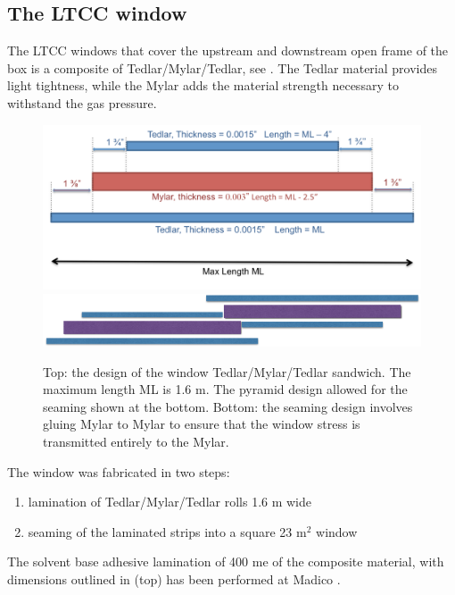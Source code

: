 \subsection{The LTCC window}

The LTCC windows that cover the upstream and downstream open frame of the box is a composite of Tedlar/Mylar/Tedlar, see . The Tedlar
material provides light tightness, while the Mylar adds the material strength necessary to withstand the gas pressure.

\begin{figure}
	\centering
	\includegraphics[width=1.0\columnwidth,keepaspectratio]{img/windowDesign.png}
	\includegraphics[width=1.0\columnwidth,keepaspectratio]{img/windowSeaming.png}
\caption{Top: the design of the window Tedlar/Mylar/Tedlar sandwich. The maximum length ML is 1.6 m. The pyramid design allowed for the seaming shown at the bottom.
			Bottom: the seaming design involves gluing Mylar to Mylar to ensure that the window stress is transmitted entirely to the Mylar. }
	\label{fig:windowDesign}
\end{figure}


The window was fabricated in two steps:

\begin{enumerate}
	\item lamination of Tedlar/Mylar/Tedlar rolls 1.6 m  wide
	\item seaming of the laminated strips into a square 23 m$^2$ window
\end{enumerate}

The solvent base adhesive lamination of 400 me of the composite material, with dimensions outlined in  (top) has been performed
at Madico \cite{madico}.


